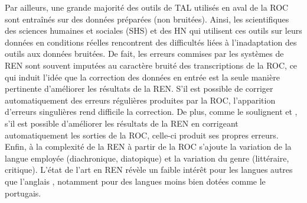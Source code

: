 Par ailleurs, une grande majorité des outils de TAL utilisés en aval de la ROC sont entraînés sur des données préparées (non bruitées). Ainsi, les scientifiques des sciences humaines et sociales (SHS) et des HN qui utilisent ces outils sur leurs données en conditions réelles rencontrent des difficultés liées à l'inadaptation des outils aux données bruitées. De fait, les erreurs commises par les systèmes de REN sont souvent imputées au caractère bruité des transcriptions de la ROC, ce qui induit l'idée que la correction des données en entrée est la seule manière pertinente d'améliorer les résultats de la REN. 
S'il est possible de corriger automatiquement des erreurs régulières produites par la ROC, l'apparition d’erreurs singulières rend difficile la correction. De plus, comme le soulignent  et , s'il est possible d'améliorer les résultats de la REN en corrigeant automatiquement les sorties de la ROC, celle-ci produit ses propres erreurs. Enfin, à la complexité de la REN à partir de la ROC s'ajoute la variation de la langue employée (diachronique, diatopique) %
et la variation du genre (littéraire, critique). L'état de l'art en REN révèle un faible intérêt pour les langues autres que l’anglais \cite{lejeune:hal-01294127,rahimi-etal-2019-massively}, notamment pour des langues moins bien dotées comme le portugais.

